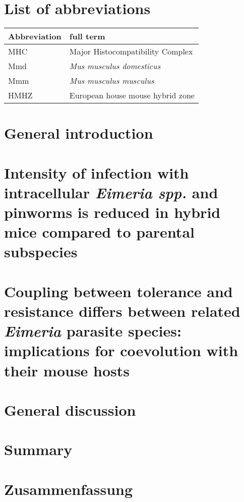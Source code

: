 \documentclass[11pt]{report}
\begin{document}

\clearpage

\clearpage

\tableofcontents

\chapter*{List of abbreviations}
\begin{tabular}{l l}
Abbreviation & full term \\
\hline
MHC & Major Histocompatibility Complex \\
Mmd & \textit{Mus musculus domesticus} \\
Mmm    & \textit{Mus musculus musculus}  \\
HMHZ   & European house mouse hybrid zone \\
\end{tabular}

\chapter{General introduction}

 
\chapter{Intensity of infection with intracellular \textit{Eimeria spp.} and pinworms is reduced in hybrid mice compared to parental subspecies}


\chapter{Coupling between tolerance and resistance differs between related \textit{Eimeria} parasite species: implications for coevolution with their mouse hosts}


\chapter{General discussion}


\chapter*{Summary}


\chapter*{Zusammenfassung}

\end{document}
